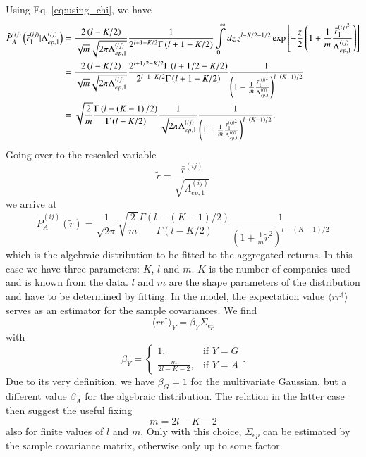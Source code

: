 Using Eq. \ref{eq:using_chi}, we have
\begin{align}
    \tilde{P}_{A}^{\left(ij\right)}\left(\bar{r}_{1}^{\left(ij\right)}|\Lambda_{ep,1}^{\left(ij\right)}\right) & =\frac{2\left(l-K/2\right)}{\sqrt{m}\sqrt{2\pi\Lambda_{ep,1}^{\left(ij\right)}}}\frac{1}{2^{l+1-K/2}\Gamma\left(l+1-K/2\right)}\intop_{0}^{\infty}dz\,z^{l-K/2-1/2}\exp\left[-\frac{z}{2}\left(1+\frac{1}{m}\frac{\bar{r}_{1}^{\left(ij\right)^{2}}}{\Lambda_{ep,1}^{\left(ij\right)}}\right)\right]\\
    & =\frac{2\left(l-K/2\right)}{\sqrt{m}\sqrt{2\pi\Lambda_{ep,1}^{\left(ij\right)}}}\frac{2^{l+1/2-K/2}\Gamma\left(l+1/2-K/2\right)}{2^{l+1-K/2}\Gamma\left(l+1-K/2\right)}\frac{1}{\left(1+\frac{1}{m}\frac{\bar{r}_{1}^{\left(ij\right)^{2}}}{\Lambda_{ep,1}^{\left(ij\right)}}\right)^{l-\left(K-1\right)/2}}\\
    & =\sqrt{\frac{2}{m}}\frac{\Gamma\left(l-\left(K-1\right)/2\right)}{\Gamma\left(l-K/2\right)}\frac{1}{\sqrt{2\pi\Lambda_{ep,1}^{\left(ij\right)}}}\frac{1}{\left(1+\frac{1}{m}\frac{\bar{r}_{1}^{\left(ij\right)^{2}}}{\Lambda_{ep,1}^{\left(ij\right)}}\right)^{l-\left(K-1\right)/2}}.
\end{align}
Going over to the rescaled variable
\begin{equation}
    \tilde{r} = \frac{\bar{r}^{\left( ij \right)}}{\sqrt{\Lambda_{ep,1}^{\left( ij \right)}}}
\end{equation}
we arrive at
\begin{equation}
    \tilde{P}_{A}^{\left(ij\right)}\left(\tilde{r}\right)=\frac{1}{\sqrt{2\pi}}\sqrt{\frac{2}{m}}\frac{\Gamma\left(l-\left(K-1\right)/2\right)}{\Gamma\left(l-K/2\right)}\frac{1}{\left(1+\frac{1}{m}\tilde{r}^{2}\right)^{l-\left(K-1\right)/2}}
\end{equation}
which is the algebraic distribution to be fitted to the aggregated returns.
In this case we have three parameters: $K$, $l$ and $m$. $K$ is the number
of companies used and is known from the data. $l$ and $m$ are the shape
parameters of the distribution and have to be determined by fitting.
In the model, the expectation value $\langle r r^{\dagger} \rangle$ serves
as an estimator for the sample covariances. We find
\begin{equation}
    \langle r r^{\dagger} \rangle_{Y} = \beta_{Y} \Sigma_{ep}
\end{equation}
with
\begin{equation}
    \beta_{Y}=\begin{cases}
    1, & \text{if }Y=G\\
    \frac{m}{2l-K-2}, & \text{if }Y=A
\end{cases}.
\end{equation}
Due to its very definition, we have $\beta_{G} = 1$ for the multivariate
Gaussian, but a different value $\beta_{A}$ for the algebraic distribution.
The relation in the latter case then suggest the useful fixing
\begin{equation}\label{eq:m_relation}
    m = 2l - K - 2
\end{equation}
also for finite values of $l$ and $m$. Only with this choice, $\Sigma_{ep}$
can be estimated by the sample covariance matrix, otherwise only up to some
factor.

